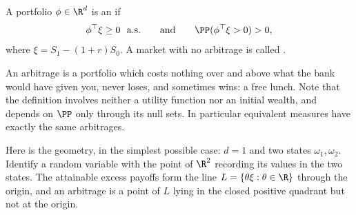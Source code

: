 \begin{definition}[Arbitrage]
	A portfolio $\phi \in \R^d$ is an  if
	$$
	\phi^\top \xi \geq 0 \ \text{ a.s.} \qquad \text{and} \qquad \PP(\phi^\top \xi > 0) > 0,
	$$
	where $\xi = S_1 - (1+r)S_0$. A market with no arbitrage is called .
\end{definition}

An arbitrage is a portfolio which costs nothing over and above what the bank would have given you, never loses, and sometimes wins: a free lunch. Note that the definition involves neither a utility function nor an initial wealth, and depends on $\PP$ only through its null sets. In particular equivalent measures have exactly the same arbitrages.

Here is the geometry, in the simplest possible case: $d = 1$ and two states $\omega_1, \omega_2$. Identify a random variable with the point of $\R^2$ recording its values in the two states. The attainable excess payoffs form the line $L = \{\theta\xi : \theta \in \R\}$ through the origin, and an arbitrage is a point of $L$ lying in the closed positive quadrant but not at the origin.

\begin{center}
\end{center}

